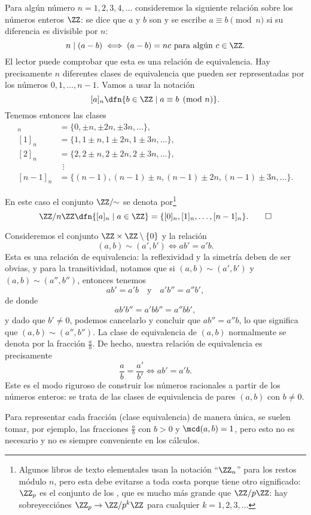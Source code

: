 \begin{ejemplo}
  Para algún número $n = 1,2,3,4,\ldots$ consideremos la siguiente relación
  sobre los números enteros $\ZZ$: se dice que $a$ y $b$ son  y se escribe
  $a \equiv b \pmod{n}$ si su diferencia es
  divisible por $n$:
  $$n \mid (a-b) \iff (a-b) = nc \text{ para algún }c \in \ZZ.$$
  El lector puede comprobar que esta es una relación de equivalencia.
  Hay precisamente $n$ diferentes clases de equivalencia que pueden ser
  representadas por los números $0,1,\ldots,n-1$. Vamos a usar
  la notación
  $$[a]_n \dfn \{ b\in \ZZ \mid a\equiv b \pmod{n} \}.$$
  Tenemos entonces las clases
  \begin{align*}
    [0]_n & = \{ 0, \pm n, \pm 2n, \pm 3n, \ldots \},\\
    [1]_n & = \{ 1, 1 \pm n, 1 \pm 2n, 1 \pm 3n, \ldots \},\\
    [2]_n & = \{ 2, 2 \pm n, 2 \pm 2n, 2 \pm 3n, \ldots \},\\
          & ~~\vdots \\
    [n-1]_n & = \{ (n-1), (n-1) \pm n, (n-1) \pm 2n, (n-1) \pm 3n, \ldots \}.
  \end{align*}

  En este caso el conjunto $\ZZ/\!\!\sim$ se denota
  por\footnote{Algunos libros de texto
    elementales usan la notación ``$\ZZ_n$'' para los restos módulo $n$, pero
    esta debe evitarse a toda costa porque tiene otro significado: $\ZZ_p$ es el
    conjunto de los , que es mucho más grande
    que $\ZZ/p\ZZ$: hay sobreyecciónes $\ZZ_p \to \ZZ/p^k\ZZ$ para cualquier
    $k = 1,2,3,\ldots$}
  \[ \ZZ/n\ZZ \dfn \{ [a]_n \mid a \in \ZZ \} =
    \{ [0]_n, [1]_n, \ldots, [n-1]_n \}. \qedhere \]
\end{ejemplo}

\begin{ejemplo}
  Consideremos el conjunto $\ZZ \times \ZZ\setminus \{ 0 \}$ y la relación
  $$(a,b) \sim (a',b') \iff ab' = a'b.$$ 
  Esta es una relación de equivalencia: la reflexividad y la simetría deben de
  ser obvias, y para la transitividad, notamos que si $(a,b) \sim (a',b')$ y
  $(a,b) \sim (a'',b'')$, entonces tenemos
  $$ab' = a'b \quad\text{y}\quad a'b'' = a''b',$$
  de donde
  $$ab'b'' = a'bb'' = a''bb',$$
  y dado que $b' \ne 0$, podemos cancelarlo y concluir que $ab'' = a''b$, lo que
  significa que $(a,b) \sim (a'',b'')$. La clase de equivalencia de $(a,b)$
  normalmente se denota por la fracción $\frac{a}{b}$. De hecho, nuestra
  relación de equivalencia es precisamente
  $$\frac{a}{b} = \frac{a'}{b'} \iff ab' = a'b.$$
  Este es el modo riguroso de construir los números racionales a partir de los
  números enteros: se trata de las clases de equivalencia de pares $(a,b)$ con
  $b \ne 0$.

  Para representar cada fracción (clase equivalencia) de manera única, se suelen
  tomar, por ejemplo, las fracciones $\frac{a}{b}$ con $b > 0$ y
  $\mcd (a,b) = 1$, pero esto no es necesario y no es siempre conveniente en los
  cálculos.
\end{ejemplo}

